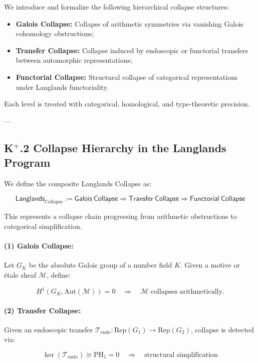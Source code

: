 \documentclass[11pt]{article}
\begin{document}
We introduce and formalize the following hierarchical collapse structures:

\begin{itemize}
    \item \textbf{Galois Collapse:} Collapse of arithmetic symmetries via vanishing Galois cohomology obstructions;
    \item \textbf{Transfer Collapse:} Collapse induced by endoscopic or functorial transfers between automorphic representations;
    \item \textbf{Functorial Collapse:} Structural collapse of categorical representations under Langlands functoriality.
\end{itemize}

Each level is treated with categorical, homological, and type-theoretic precision.

---

\subsection*{K$^{+}$.2 Collapse Hierarchy in the Langlands Program}

We define the composite Langlands Collapse as:

\[
\mathsf{Langlands}_{\text{Collapse}} := 
\mathsf{Galois\ Collapse} 
\Rightarrow \mathsf{Transfer\ Collapse} 
\Rightarrow \mathsf{Functorial\ Collapse}
\]

This represents a collapse chain progressing from arithmetic obstructions to categorical simplification.

\paragraph{(1) Galois Collapse:}
Let \( G_K \) be the absolute Galois group of a number field \( K \). Given a motive or étale sheaf \( \mathcal{M} \), define:

\[
H^1(G_K, \mathrm{Aut}(\mathcal{M})) = 0 \quad \Rightarrow \quad \mathcal{M} \text{ collapses arithmetically.}
\]

\paragraph{(2) Transfer Collapse:}
Given an endoscopic transfer \( \mathcal{T}_{\text{endo}} : \mathrm{Rep}(G_1) \to \mathrm{Rep}(G_2) \), collapse is detected via:

\[
\ker(\mathcal{T}_{\text{endo}}) \cong \mathrm{PH}_1 = 0 \quad \Rightarrow \quad \text{structural simplification}
\]
\end{document}
